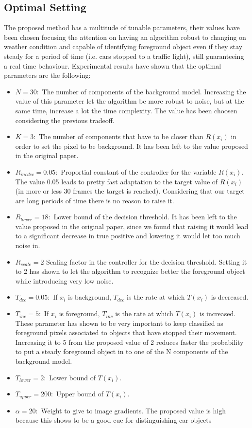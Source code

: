 \subsection{Optimal Setting}
The proposed method has a multitude of tunable parameters, their values have been chosen focusing the attention on having an algorithm robust to changing on weather condition and capable of identifying foreground object even if they stay steady for a period of time (i.e. cars stopped to a traffic light), still guaranteeing a real time behaviour. \newline
Experimental results have shown that the optimal parameters are the following:
\begin{itemize}
\item $N = 30:$ The number of components of the
background model. Increasing the value of this parameter let the algorithm be more robust to noise, but at the same time, increase a lot the time complexity. The value has been choosen considering the previous tradeoff.
\item $K = 3:$ The number of components that have to be closer than $R(x_i)$ in order to set the pixel to be background. It has been left to the value proposed in the original paper.
\item $R_{incdec} = 0.05:$ Proportial constant of the controller for the variable $R(x_i)$. The value 0.05 leads to pretty fast adaptation to the target value of $R(x_i)$ (in more or less 30 frames the target is reached). Considering that our target are long periods of time there is no reason to raise it.
\item $R_{lower}=18:$ Lower bound of the decision threshold. It has been left to the value proposed in the original paper, since we found that raising it would lead to a significant decrease in true positive and lowering it would let too much noise in.
\item $R_{scale}=2$ Scaling factor in the controller for the decision threshold. Setting it to 2 has shown to let the algorithm to recognize better the foreground object while introducing very low noise.
\item $T_{dec} = 0.05:$ If $x_i$ is background, $T_{dec}$ is the rate at which $T(x_i)$ is decreased.
\item $T_{inc} = 5:$ If $x_i$ is foreground, $T_{inc}$ is the rate at which $T(x_i)$ is increased. These parameter has shown to be very important to keep classified as foreground pixels associated to objects that have stopped their movement. Increasing it to 5 from the proposed value of 2 reduces faster the probability to put a steady foreground object in to one of the N components of the background model.
\item $T_{lower}= 2:$ Lower bound of $T(x_i)$.
\item $T_{upper}= 200:$ Upper bound of $T(x_i)$.
\item $\alpha = 20:$ Weight to give to image gradients. The proposed value is high because this shows to be a good cue for distinguishing car objects
\end{itemize} 


